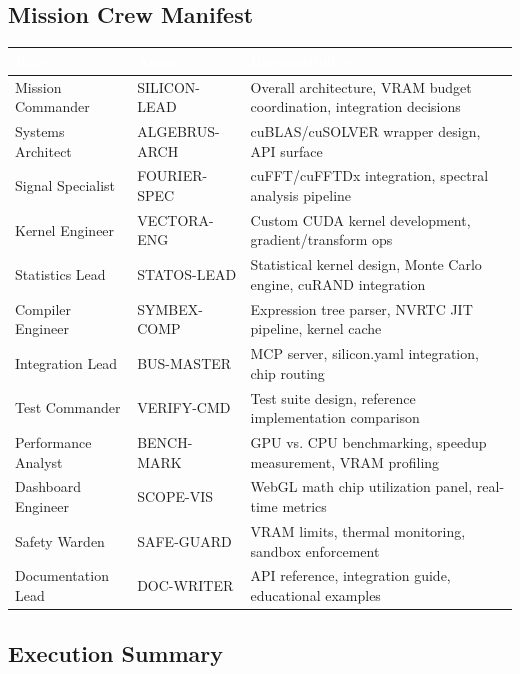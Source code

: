\documentclass[11pt,letterpaper]{article}
\newcommand{\tableheader}[1]{\textbf{\sffamily\textcolor{white}{#1}}}
\begin{document}
\subsection{Mission Crew Manifest}

\begin{center}
\begin{tabularx}{\textwidth}{L{3cm}L{3cm}X}
\toprule
{}
\tableheader{Role} & \tableheader{Agent} & \tableheader{Responsibility} \\
\midrule
Mission Commander & SILICON-LEAD & Overall architecture, VRAM budget coordination, integration decisions \\
Systems Architect & ALGEBRUS-ARCH & cuBLAS/cuSOLVER wrapper design, API surface \\
Signal Specialist & FOURIER-SPEC & cuFFT/cuFFTDx integration, spectral analysis pipeline \\
Kernel Engineer & VECTORA-ENG & Custom CUDA kernel development, gradient/transform ops \\
Statistics Lead & STATOS-LEAD & Statistical kernel design, Monte Carlo engine, cuRAND integration \\
Compiler Engineer & SYMBEX-COMP & Expression tree parser, NVRTC JIT pipeline, kernel cache \\
Integration Lead & BUS-MASTER & MCP server, silicon.yaml integration, chip routing \\
Test Commander & VERIFY-CMD & Test suite design, reference implementation comparison \\
Performance Analyst & BENCH-MARK & GPU vs. CPU benchmarking, speedup measurement, VRAM profiling \\
Dashboard Engineer & SCOPE-VIS & WebGL math chip utilization panel, real-time metrics \\
Safety Warden & SAFE-GUARD & VRAM limits, thermal monitoring, sandbox enforcement \\
Documentation Lead & DOC-WRITER & API reference, integration guide, educational examples \\
\bottomrule
\end{tabularx}
\end{center}

\subsection{Execution Summary}
\end{document}
